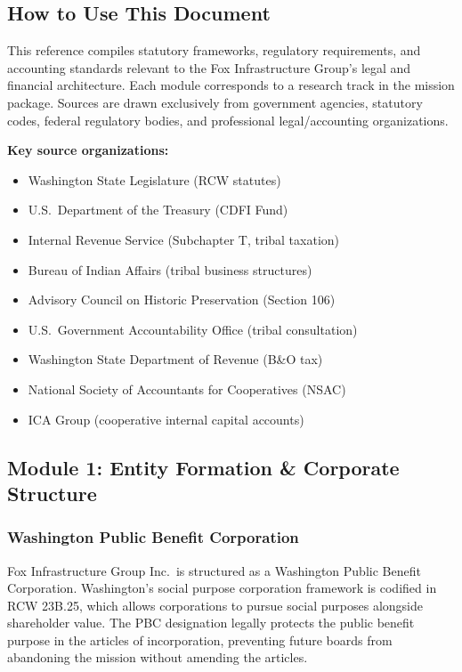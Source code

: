 \documentclass[11pt,letterpaper]{article}
\begin{document}
\subsection{How to Use This Document}

This reference compiles statutory frameworks, regulatory requirements, and accounting standards relevant to the Fox Infrastructure Group's legal and financial architecture. Each module corresponds to a research track in the mission package. Sources are drawn exclusively from government agencies, statutory codes, federal regulatory bodies, and professional legal/accounting organizations.

\textbf{Key source organizations:}
\begin{itemize}[leftmargin=2em]
  \item Washington State Legislature (RCW statutes)
  \item U.S.\ Department of the Treasury (CDFI Fund)
  \item Internal Revenue Service (Subchapter T, tribal taxation)
  \item Bureau of Indian Affairs (tribal business structures)
  \item Advisory Council on Historic Preservation (Section 106)
  \item U.S.\ Government Accountability Office (tribal consultation)
  \item Washington State Department of Revenue (B\&O tax)
  \item National Society of Accountants for Cooperatives (NSAC)
  \item ICA Group (cooperative internal capital accounts)
\end{itemize}

\subsection{Module 1: Entity Formation \& Corporate Structure}

\subsubsection{Washington Public Benefit Corporation}

Fox Infrastructure Group Inc.\ is structured as a Washington Public Benefit Corporation. Washington's social purpose corporation framework is codified in RCW 23B.25, which allows corporations to pursue social purposes alongside shareholder value. The PBC designation legally protects the public benefit purpose in the articles of incorporation, preventing future boards from abandoning the mission without amending the articles.
\end{document}
